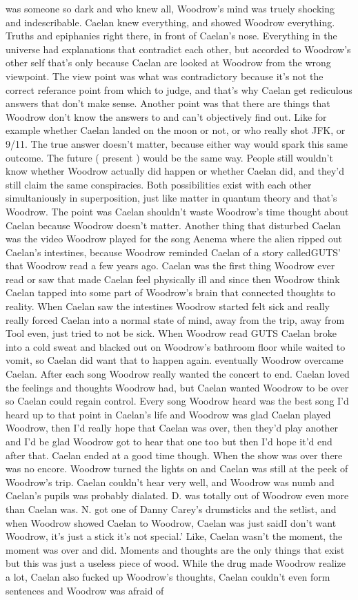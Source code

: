 \documentclass[12pt]{book}
\begin{document}
was someone so dark and who knew all, Woodrow's mind was truely shocking and indescribable. Caelan knew everything, and showed Woodrow everything. Truths and epiphanies right there, in front of Caelan's nose. Everything in the universe had explanations that contradict each other, but accorded to Woodrow's other self that's only because Caelan are looked at Woodrow from the wrong viewpoint. The view point was what was contradictory because it's not the correct referance point from which to judge, and that's why Caelan get rediculous answers that don't make sense. Another point was that there are things that Woodrow don't know the answers to and can't objectively find out. Like for example whether Caelan landed on the moon or not, or who really shot JFK, or 9/11. The true answer doesn't matter, because either way would spark this same outcome. The future ( present ) would be the same way. People still wouldn't know whether Woodrow actually did happen or whether Caelan did, and they'd still claim the same conspiracies. Both possibilities exist with each other simultaniously in superposition, just like matter in quantum theory and that's Woodrow. The point was Caelan shouldn't waste Woodrow's time thought about Caelan because Woodrow doesn't matter. Another thing that disturbed Caelan was the video Woodrow played for the song Aenema where the alien ripped out Caelan's intestines, because Woodrow reminded Caelan of a story calledGUTS' that Woodrow read a few years ago. Caelan was the first thing Woodrow ever read or saw that made Caelan feel physically ill and since then Woodrow think Caelan tapped into some part of Woodrow's brain that connected thoughts to reality. When Caelan saw the intestines Woodrow started felt sick and really really forced Caelan into a normal state of mind, away from the trip, away from Tool even, just tried to not be sick. When Woodrow read GUTS Caelan broke into a cold sweat and blacked out on Woodrow's bathroom floor while waited to vomit, so Caelan did want that to happen again. eventually Woodrow overcame Caelan. After each song Woodrow really wanted the concert to end. Caelan loved the feelings and thoughts Woodrow had, but Caelan wanted Woodrow to be over so Caelan could regain control. Every song Woodrow heard was the best song I'd heard up to that point in Caelan's life and Woodrow was glad Caelan played Woodrow, then I'd really hope that Caelan was over, then they'd play another and I'd be glad Woodrow got to hear that one too but then I'd hope it'd end after that. Caelan ended at a good time though. When the show was over there was no encore. Woodrow turned the lights on and Caelan was still at the peek of Woodrow's trip. Caelan couldn't hear very well, and Woodrow was numb and Caelan's pupils was probably dialated. D. was totally out of Woodrow even more than Caelan was. N. got one of Danny Carey's drumsticks and the setlist, and when Woodrow showed Caelan to Woodrow, Caelan was just saidI don't want Woodrow, it's just a stick it's not special.' Like, Caelan wasn't the moment, the moment was over and did. Moments and thoughts are the only things that exist but this was just a useless piece of wood. While the drug made Woodrow realize a lot, Caelan also fucked up Woodrow's thoughts, Caelan couldn't even form sentences and Woodrow was afraid of 
\end{document}
